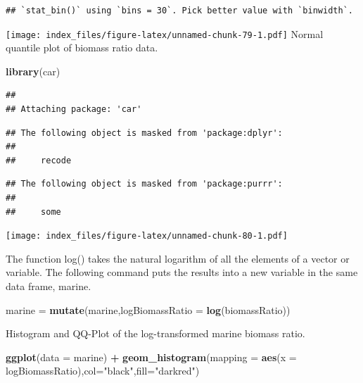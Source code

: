 \documentclass[]{article}
\newenvironment{Shaded}{\begin{snugshade}}{\end{snugshade}}
\newcommand{\DataTypeTok}[1]{\textcolor[rgb]{0.13,0.29,0.53}{#1}}
\newcommand{\KeywordTok}[1]{\textcolor[rgb]{0.13,0.29,0.53}{\textbf{#1}}}
\newcommand{\NormalTok}[1]{#1}
\newcommand{\OperatorTok}[1]{\textcolor[rgb]{0.81,0.36,0.00}{\textbf{#1}}}
\newcommand{\StringTok}[1]{\textcolor[rgb]{0.31,0.60,0.02}{#1}}
\begin{document}
\begin{verbatim}
## `stat_bin()` using `bins = 30`. Pick better value with `binwidth`.
\end{verbatim}

\texttt{[image: index\_files/figure-latex/unnamed-chunk-79-1.pdf]} Normal
quantile plot of biomass ratio data.

\begin{Shaded}
\begin{Highlighting}[]
\KeywordTok{library}\NormalTok{(car)}
\end{Highlighting}
\end{Shaded}

\begin{verbatim}
## 
## Attaching package: 'car'
\end{verbatim}

\begin{verbatim}
## The following object is masked from 'package:dplyr':
## 
##     recode
\end{verbatim}

\begin{verbatim}
## The following object is masked from 'package:purrr':
## 
##     some
\end{verbatim}

\begin{Shaded}
\end{Shaded}

\texttt{[image: index\_files/figure-latex/unnamed-chunk-80-1.pdf]}

The function log() takes the natural logarithm of all the elements of a
vector or variable. The following command puts the results into a new
variable in the same data frame, marine.

\begin{Shaded}
\begin{Highlighting}[]
\NormalTok{marine =}\StringTok{ }\KeywordTok{mutate}\NormalTok{(marine,}\DataTypeTok{logBiomassRatio =}  \KeywordTok{log}\NormalTok{(biomassRatio))}
\end{Highlighting}
\end{Shaded}

Histogram and QQ-Plot of the log-transformed marine biomass ratio.

\begin{Shaded}
\begin{Highlighting}[]
\KeywordTok{ggplot}\NormalTok{(}\DataTypeTok{data =}\NormalTok{ marine) }\OperatorTok{+}
\StringTok{  }\KeywordTok{geom_histogram}\NormalTok{(}\DataTypeTok{mapping =} \KeywordTok{aes}\NormalTok{(}\DataTypeTok{x =}\NormalTok{ logBiomassRatio),}\DataTypeTok{col=}\StringTok{"black"}\NormalTok{,}\DataTypeTok{fill=}\StringTok{"darkred"}\NormalTok{)}
\end{Highlighting}
\end{Shaded}
\end{document}
